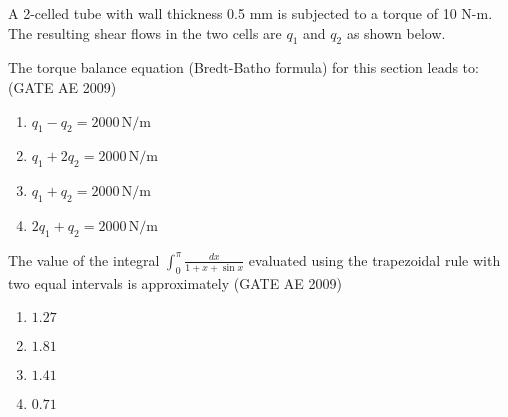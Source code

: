     
    \item A 2-celled tube with wall thickness 0.5 mm is subjected to a torque of 10 N-m. The resulting shear flows in the two cells are \( q_1 \) and \( q_2 \) as shown below. 
    
    
   \begin{center}
   \end{center}
    
    \noindent The torque balance equation (Bredt-Batho formula) for this section leads to:  \hfill (GATE AE 2009)
    \begin{multicols}{2}
        \begin{enumerate}
            \item \( q_1 - q_2 = 2000 \, \text{N/m} \)
            \item \( q_1 + 2q_2 = 2000 \, \text{N/m} \)
            \item \( q_1 + q_2 = 2000 \, \text{N/m} \)
            \item \( 2q_1 + q_2 = 2000 \, \text{N/m} \)
        \end{enumerate}
    \end{multicols}
        

    \item The value of the integral $\int_0^\pi \frac{dx}{1+x+\sin x}$ evaluated using the trapezoidal rule with two equal intervals is approximately  \hfill (GATE AE 2009)
    \begin{multicols}{4}
        \begin{enumerate}
            \item $1.27$
            \item $1.81$
            \item $1.41$
            \item $0.71$
        \end{enumerate}
    \end{multicols}

